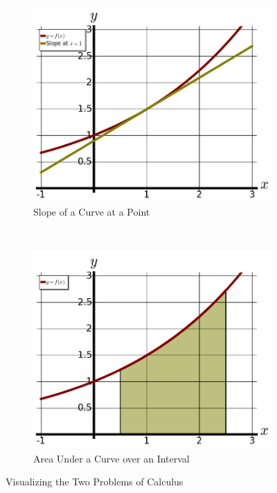 \begin{figure}[ht!]
    \centering
    \begin{subfigure}[b]{0.45\textwidth}
        \includegraphics[width=\textwidth]{img/chap0/ex0-1.png}
        \caption{Slope of a Curve at a Point}
        \label{fig:0slope}
    \end{subfigure}
    ~ %
    \begin{subfigure}[b]{0.45\textwidth}
        \includegraphics[width=\textwidth]{img/chap0/ex0-2.png}
        \caption{Area Under a Curve over an Interval}
        \label{fig:0area}
    \end{subfigure}
    \caption{Visualizing the Two Problems of Calculus}\label{fig:0-1}
\end{figure}

